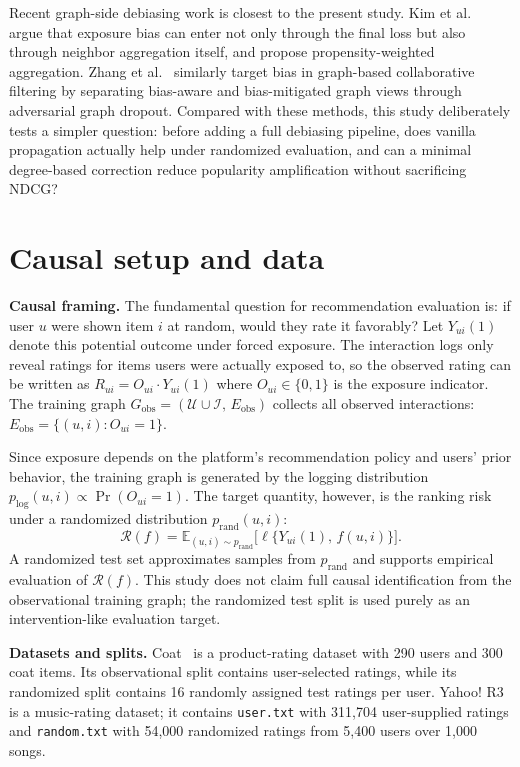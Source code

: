 \documentclass[10pt]{article}
\begin{document}
Recent graph-side debiasing work is closest to the present study. Kim et al.~\citep{kim2022} argue that exposure bias can enter not only through the final loss but also through neighbor aggregation itself, and propose propensity-weighted aggregation. Zhang et al.~\citep{zhang2024} similarly target bias in graph-based collaborative filtering by separating bias-aware and bias-mitigated graph views through adversarial graph dropout. Compared with these methods, this study deliberately tests a simpler question: before adding a full debiasing pipeline, does vanilla propagation actually help under randomized evaluation, and can a minimal degree-based correction reduce popularity amplification without sacrificing NDCG?

\section{Causal setup and data}
\label{sec:setup}

\textbf{Causal framing.} The fundamental question for recommendation evaluation is: if user $u$ were shown item $i$ at random, would they rate it favorably? Let $Y_{ui}(1)$ denote this potential outcome under forced exposure. The interaction logs only reveal ratings for items users were actually exposed to, so the observed rating can be written as $R_{ui} = O_{ui} \cdot Y_{ui}(1)$ where $O_{ui}\in\{0,1\}$ is the exposure indicator. The training graph $G_{\text{obs}}=(\mathcal U\cup\mathcal I,\,E_{\text{obs}})$ collects all observed interactions: $E_{\text{obs}}=\{(u,i):O_{ui}=1\}$.

Since exposure depends on the platform's recommendation policy and users' prior behavior, the training graph is generated by the logging distribution $p_{\text{log}}(u,i)\propto\Pr(O_{ui}=1)$. The target quantity, however, is the ranking risk under a randomized distribution $p_{\text{rand}}(u,i)$:
\[
  \mathcal{R}(f) = \mathbb{E}_{(u,i)\sim p_{\text{rand}}}\bigl[\ell\{Y_{ui}(1),\,f(u,i)\}\bigr].
\]
A randomized test set approximates samples from $p_{\text{rand}}$ and supports empirical evaluation of $\mathcal{R}(f)$. This study does not claim full causal identification from the observational training graph; the randomized test split is used purely as an intervention-like evaluation target.

\textbf{Datasets and splits.} Coat~\citep{schnabel2016} is a product-rating dataset with 290 users and 300 coat items. Its observational split contains user-selected ratings, while its randomized split contains 16 randomly assigned test ratings per user. Yahoo! R3~\citep{yahoor3kaggle} is a music-rating dataset; it contains \texttt{user.txt} with 311{,}704 user-supplied ratings and \texttt{random.txt} with 54{,}000 randomized ratings from 5{,}400 users over 1{,}000 songs. 
\end{document}
